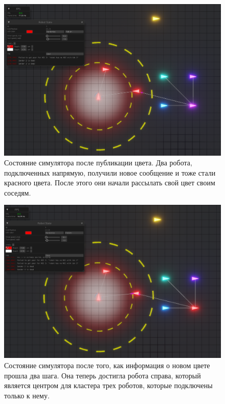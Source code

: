 \documentclass[%
]{report}
\begin{document}
\begin{figure}
  \includegraphics[width = \textwidth]{colors-2.png}
  \caption{Состояние симулятора после публикации цвета. Два робота, подключенных напрямую,
  получили новое сообщение и тоже стали красного цвета. После этого они начали рассылать свой цвет своим соседям.}
\end{figure}

\begin{figure}
  \includegraphics[width = \textwidth]{colors-3.png}
  \caption{Состояние симулятора после того, как информация о новом цвете прошла два шага. Она теперь достигла робота справа,
  который является центром для кластера трех роботов, которые подключены только к нему.}
\end{figure}
\end{document}
